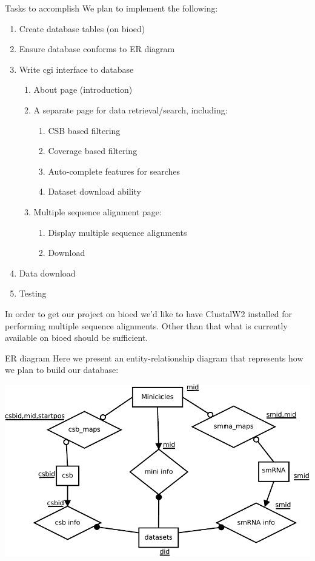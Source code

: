 \documentclass[a4paper,10pt,notitlepage]{article}
\begin{document}
\begin{section}{Tasks to accomplish}
    We plan to implement the following:

    \begin{enumerate}
        \item Create database tables (on bioed)
        \item Ensure database conforms to ER diagram
        \item Write cgi interface to database
        \begin{enumerate}
            \item About page (introduction)
            \item A separate page for data retrieval/search, including:
                \begin{enumerate}
                    \item CSB based filtering
                    \item Coverage based filtering
                    \item Auto-complete features for searches
                    \item Dataset download ability
                \end{enumerate}
            \item Multiple sequence alignment page:
                \begin{enumerate}
                    \item Display multiple sequence alignments
                    \item Download
                \end{enumerate}
        \end{enumerate}
        \item Data download
        \item Testing
    \end{enumerate}

    In order to get our project on bioed we'd like to have ClustalW2 installed for performing multiple sequence alignments. Other
    than that what is currently available on bioed should be sufficient.

\end{section}


\begin{section}{ER diagram}
    Here we present an entity-relationship diagram that represents how we plan to build our database:

    \includegraphics[width=.8\textwidth]{ERdiagram-crop.pdf}
    
\end{section}
\end{document}
